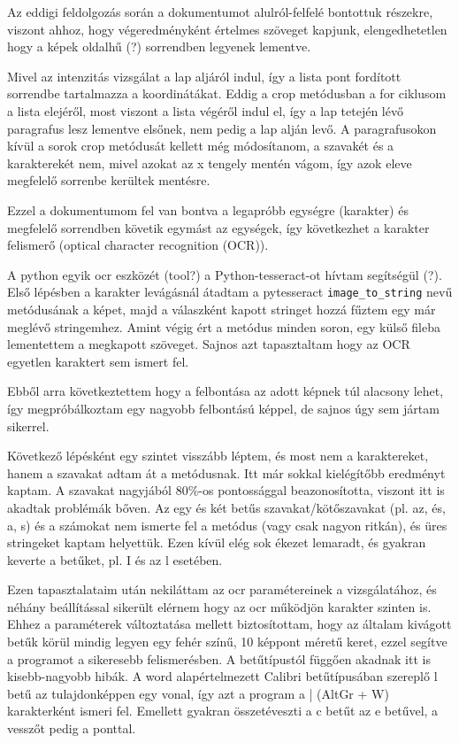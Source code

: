 Az eddigi feldolgozás során a dokumentumot alulról-felfelé bontottuk részekre, viszont ahhoz, hogy végeredményként értelmes szöveget kapjunk, elengedhetetlen hogy a képek oldalhű (?) sorrendben legyenek lementve.

Mivel az intenzitás vizsgálat a lap aljáról indul, így a lista pont fordított sorrendbe tartalmazza a koordinátákat. Eddig a crop metódusban a for ciklusom a lista elejéről, most viszont a lista végéről indul el, így a lap tetején lévő paragrafus lesz lementve elsőnek, nem pedig a lap alján levő. A paragrafusokon kívül a sorok crop metódusát kellett még módosítanom, a szavakét és a karakterekét nem, mivel azokat az x tengely mentén vágom, így azok eleve megfelelő sorrenbe kerültek mentésre.

Ezzel a dokumentumom fel van bontva a legapróbb egységre (karakter) és megfelelő sorrendben követik egymást az egységek, így következhet a karakter felismerő (optical character recognition (OCR)).

A python egyik ocr eszközét (tool?) a Python-tesseract-ot hívtam segítségül (?). Első lépésben a karakter levágásnál átadtam a pytesseract \texttt{image\_to\_string} nevű metódusának a képet, majd a válaszként kapott stringet hozzá fűztem egy már meglévő stringemhez. Amint végig ért a metódus minden soron, egy külső fileba lementettem a megkapott szöveget. Sajnos azt tapasztaltam hogy az OCR egyetlen karaktert sem ismert fel.

Ebből arra következtettem hogy a felbontása az adott képnek túl alacsony lehet, így megpróbálkoztam egy nagyobb felbontású képpel, de sajnos úgy sem jártam sikerrel.

Következő lépésként egy szintet visszább léptem, és most nem a karaktereket, hanem a szavakat adtam át a metódusnak. Itt már sokkal kielégítőbb eredményt kaptam. A szavakat nagyjából 80\%-os pontossággal beazonosította, viszont itt is akadtak problémák bőven. Az egy és két betűs szavakat/kötőszavakat (pl. az, és, a, s) és a számokat nem ismerte fel a metódus (vagy csak nagyon ritkán), és üres stringeket kaptam helyettük. Ezen kívül elég sok ékezet lemaradt, és gyakran keverte a betűket, pl. I és az l esetében.

Ezen tapasztalataim után nekiláttam az ocr paramétereinek a vizsgálatához, és néhány beállítással sikerült elérnem hogy az ocr működjön karakter szinten is. Ehhez a paraméterek változtatása mellett biztosítottam, hogy az általam kivágott betűk körül mindig legyen egy fehér színű, 10 képpont méretű keret, ezzel segítve a programot a sikeresebb felismerésben. A betűtípustól függően akadnak itt is kisebb-nagyobb hibák. A word alapértelmezett Calibri betűtípusában szereplő l betű az tulajdonképpen egy vonal, így azt a program a | (AltGr + W) karakterként ismeri fel. Emellett gyakran összetéveszti a c betűt az e betűvel, a vesszőt pedig a ponttal.

